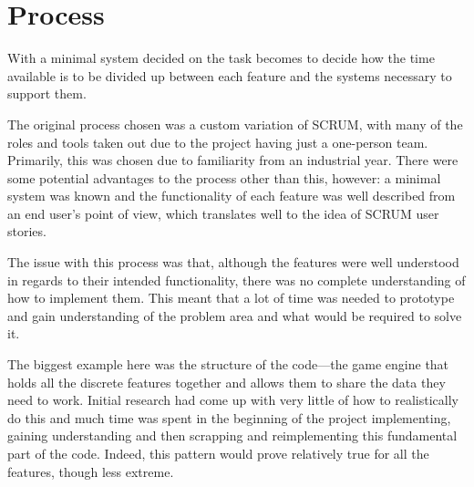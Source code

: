 



\section{Process}
With a minimal system decided on the task becomes to decide how the time available is to be divided up between each feature and the systems necessary to support them.

The original process chosen was a custom variation of SCRUM, with many of the roles and tools taken out due to the project having just a one-person team. Primarily, this was chosen due to familiarity from an industrial year. There were some potential advantages to the process other than this, however: a minimal system was known and the functionality of each feature was well described from an end user's point of view, which translates well to the idea of SCRUM user stories.

The issue with this process was that, although the features were well understood in regards to their intended functionality, there was no complete understanding of how to implement them. This meant that a lot of time was needed to prototype and gain understanding of the problem area and what would be required to solve it.

The biggest example here was the structure of the code---the game engine that holds all the discrete features together and allows them to share the data they need to work. Initial research had come up with very little of how to realistically do this and much time was spent in the beginning of the project implementing, gaining understanding and then scrapping and reimplementing this fundamental part of the code. Indeed, this pattern would prove relatively true for all the features, though less extreme.

